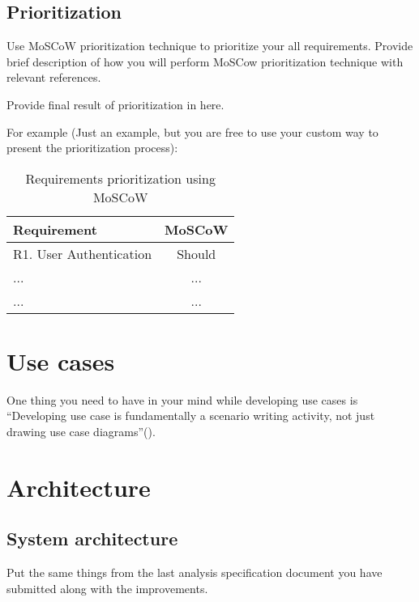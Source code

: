 
\subsection{Prioritization} %
\label{sub:prioritization}

Use MoSCoW prioritization technique to prioritize your all requirements. Provide brief description of how you will perform MoSCow prioritization technique with relevant references.

Provide final result of prioritization in here.

For example (Just an example, but you are free to use your custom way to present the prioritization process):
\begin{table}[htb!]
  \centering
\begin{tabular}{l|c}
  \bf{Requirement} & \bf{MoSCoW}\\ \hline\hline
  R1. User Authentication & Should \\ \hline
  ... & ... \\ \hline
  ... & ... \\ \hline
\end{tabular}
  \caption{Requirements prioritization using MoSCoW}
  \label{tab:moscow}
\end{table}

\section{Use cases} %
\label{sec:use_cases}

One thing you need to have in your mind while developing use cases is ``Developing use case is fundamentally a scenario writing activity, not just drawing use case diagrams''(\cite{larman2012applying}).

\section{Architecture} %
\label{sec:architecture}

\subsection{System architecture} %
\label{sub:system_architecture}
Put the same things from the last analysis specification document you have submitted along with the improvements.

